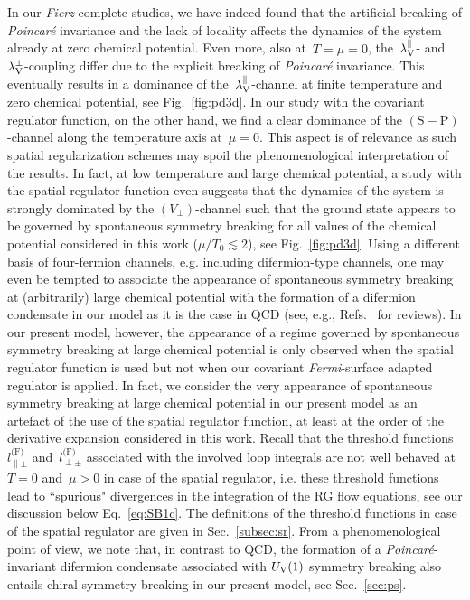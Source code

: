 \documentclass[prd,english,preprintnumbers,amsmath,amssymb,nofootinbib,twocolumn,superscriptaddress]{revtex4-1}
\begin{document}
{{In our {\it Fierz}-complete studies, 
we have indeed found that the artificial 
breaking of {\it Poincar\'{e}} invariance and the lack of locality 
affects the dynamics of the 
system already at zero chemical potential. {Even more, also} at~$T=\mu=0$, the~$\lambda_{\rm V}^{\parallel}$- 
and~$\lambda_{\rm V}^{\perp}$-coupling differ due to the explicit breaking of {\it Poincar\'{e}} invariance. 
This eventually results in a dominance of the~$\lambda_{\rm V}^{\parallel}$-channel at finite temperature and zero
chemical potential, see Fig.~\ref{fig:pd3d}. In our study with the 
covariant regulator function, on the other hand, we find a clear dominance of the $(\text{S}-\text{P})$-channel along the temperature axis
at~$\mu=0$. This aspect is of relevance
as such spatial regularization schemes may spoil the 
phenomenological interpretation of the results. {In fact,
at low temperature and large chemical potential, 
a study with the spatial regulator function even suggests that 
the dynamics of the system is strongly dominated by the $(V_{\perp})$-channel such that 
the ground state appears to be governed by spontaneous symmetry breaking for all values of the chemical potential considered
in this work ($\mu /T_0\lesssim 2$), see Fig.~\ref{fig:pd3d}. Using a different basis of four-fermion channels, e.g. including
difermion-type channels, one may even be tempted to associate the appearance of spontaneous symmetry breaking at (arbitrarily)
large chemical potential with the formation of a difermion condensate in our model
as it is the case in QCD (see, e.g., Refs.~\cite{Bailin:1983bm,Buballa:2003qv,Alford:2007xm,Anglani:2013gfu} for reviews).
In our present model, however, the appearance of a regime governed by spontaneous symmetry breaking
at large chemical potential is only observed when the spatial regulator function is used but not 
when our covariant {\it Fermi}-surface adapted regulator is applied. In fact, we consider the very appearance
of spontaneous symmetry breaking at large chemical potential in our present model as 
an artefact of the use of the spatial regulator function, at least at the order of the derivative expansion considered in this work.
Recall that the threshold functions 
$l^{\text{(F)}}_{\parallel \pm}$ and~$l^{\text{(F)}}_{\perp \pm}$ 
associated with the involved loop integrals are not well behaved at~$T=0$ and~$\mu>0$ in 
case of the spatial regulator, i.e. these threshold functions lead to ``spurious" divergences in the integration of the RG flow equations, 
see our discussion below Eq.~\eqref{eq:SB1c}. The definitions  
of the threshold functions in case of the spatial regulator are given in
 Sec.~\ref{subsec:sr}. From a phenomenological point of view, we 
note that, in contrast to QCD, the formation of a {\it Poincar\'{e}}-invariant
difermion condensate associated with $U_{\rm V}(1)$
symmetry breaking also entails chiral symmetry breaking in our present model, see Sec.~\ref{sec:ps}.}

}}
\end{document}
